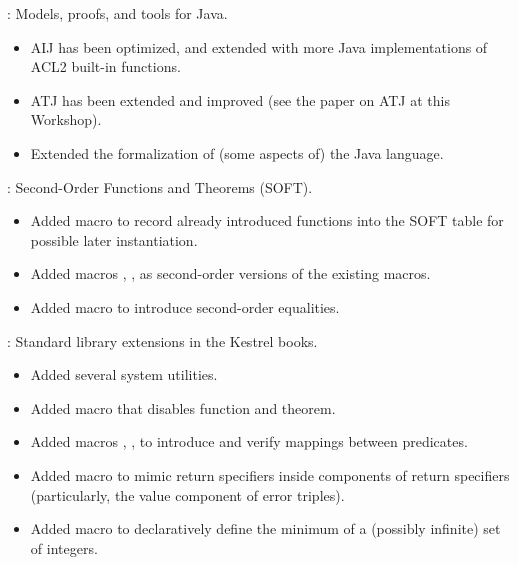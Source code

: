 
\begin{frame}

\implibtitle

:
Models, proofs, and tools for Java.
\begin{itemize}
\item AIJ has been optimized,
      and extended with more Java implementations of ACL2 built-in functions.
\item ATJ has been extended and improved
      (see the paper on ATJ at this Workshop).
\item Extended the formalization of (some aspects of) the Java language.
\end{itemize}

\end{frame}


\begin{frame}

\implibtitle

:
Second-Order Functions and Theorems (SOFT).
\begin{itemize}
\item Added macro  to record already introduced functions
      into the SOFT table for possible later instantiation.
\item Added macros , , 
      as second-order versions of the existing macros.
\item Added macro  to introduce second-order equalities.
\end{itemize}

\end{frame}


\begin{frame}

\implibtitle

:
Standard library extensions in the Kestrel books.
\begin{itemize}
\item Added several system utilities.
\item Added macro  that disables function and theorem.
\item Added macros , , 
      to introduce and verify mappings between predicates.
\item Added macro  to mimic  return specifiers
      inside components of  return specifiers
      (particularly, the value component of error triples).
\item Added macro  to declaratively define
      the minimum of a (possibly infinite) set of integers.
\end{itemize}

\end{frame}

